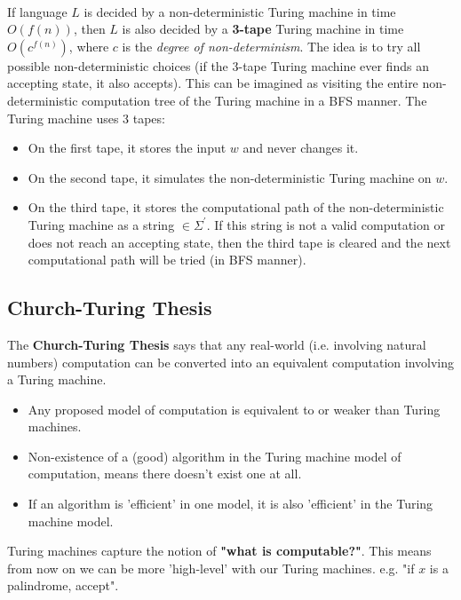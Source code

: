\documentclass[12pt]{article}
\begin{document}
\noindent
\\
If language $L$ is decided by a non-deterministic Turing machine in time $O(f(n))$, then $L$ is also decided by a \textbf{3-tape} Turing machine in time $O(c^{f(n)})$, where $c$ is the \textit{degree of non-determinism}.
The idea is to try all possible non-deterministic choices (if the 3-tape Turing machine ever finds an accepting state, it also accepts).
This can be imagined as visiting the entire non-deterministic computation tree of the Turing machine in a BFS manner.
The Turing machine uses 3 tapes:

\begin{itemize}
    \item On the first tape, it stores the input $w$ and never changes it.
    \item On the second tape, it simulates the non-deterministic Turing machine on $w$.
    \item On the third tape, it stores the computational path of the non-deterministic Turing machine as a string $\in \Sigma^\prime$. If this string is not a valid computation or does not reach an accepting state, then the third tape is cleared and the next computational path will be tried (in BFS manner).
\end{itemize}

\subsection*{Church-Turing Thesis}
The \textbf{Church-Turing Thesis} says that any real-world (i.e. involving natural numbers) computation can be converted into an equivalent computation involving a Turing machine.

\begin{itemize}
    \item Any proposed model of computation is equivalent to or weaker than Turing machines.
    \item Non-existence of a (good) algorithm in the Turing machine model of computation, means there doesn't exist one at all.
    \item If an algorithm is 'efficient' in one model, it is also 'efficient' in the Turing machine model.
\end{itemize}

\noindent
Turing machines capture the notion of \textbf{"what is computable?"}.
This means from now on we can be more 'high-level' with our Turing machines.
e.g. "if $x$ is a palindrome, accept".

%
%
\newpage
\end{document}
